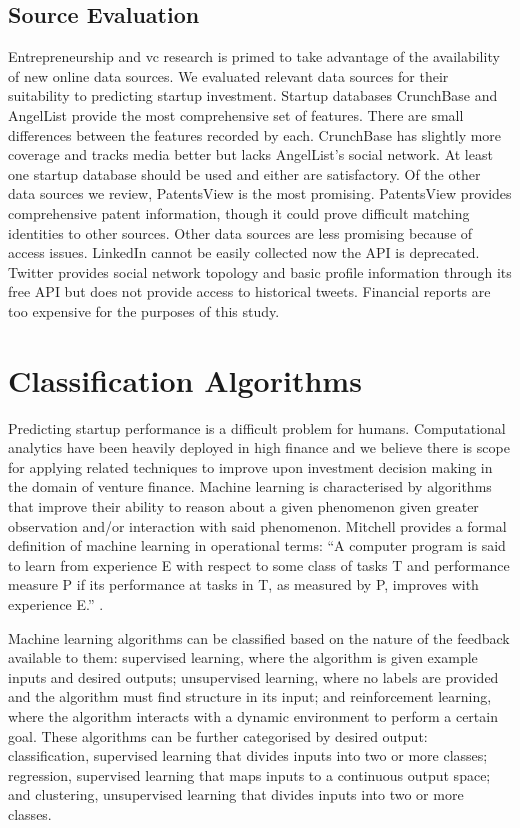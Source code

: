 \documentclass[../thesis/thesis.tex]{subfiles}
\begin{document}
\subsection{Source Evaluation}

Entrepreneurship and \gls{vc} research is primed to take advantage of the availability of new online data sources. We evaluated relevant data sources for their suitability to predicting startup investment. Startup databases CrunchBase and AngelList provide the most comprehensive set of features. There are small differences between the features recorded by each. CrunchBase has slightly more coverage and tracks media better but lacks AngelList's social network. At least one startup database should be used and either are satisfactory. Of the other data sources we review, PatentsView  is the most promising. PatentsView provides comprehensive patent information, though it could prove difficult matching identities to other sources. Other data sources are less promising because of access issues. LinkedIn cannot be easily collected now the API is deprecated. Twitter provides social network topology and basic profile information through its free API but does not provide access to historical tweets. Financial reports are too expensive for the purposes of this study.

\section{Classification Algorithms}

Predicting startup performance is a difficult problem for humans. Computational analytics have been heavily deployed in high finance and we believe there is scope for applying related techniques to improve upon investment decision making in the domain of venture finance. Machine learning is characterised by algorithms that improve their ability to reason about a given phenomenon given greater observation and/or interaction with said phenomenon. Mitchell provides a formal definition of machine learning in operational terms: ``A computer program is said to learn from experience E with respect to some class of tasks T and performance measure P if its performance at tasks in T, as measured by P, improves with experience E.'' \cite{mitchell1997}.

Machine learning algorithms can be classified based on the nature of the feedback available to them: supervised learning, where the algorithm is given example inputs and desired outputs; unsupervised learning, where no labels are provided and the algorithm must find structure in its input; and reinforcement learning, where the algorithm interacts with a dynamic environment to perform a certain goal. These algorithms can be further categorised by desired output: classification, supervised learning that divides inputs into two or more classes; regression, supervised learning that maps inputs to a continuous output space; and clustering, unsupervised learning that divides inputs into two or more classes.
\end{document}
